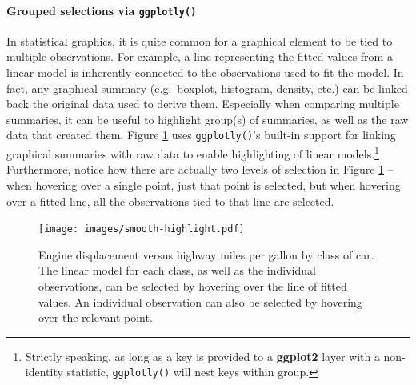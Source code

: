 \documentclass[12pt,]{isuthesis}
\newenvironment{Shaded}{\begin{snugshade}}{\end{snugshade}}
\newcommand{\KeywordTok}[1]{\textcolor[rgb]{0.13,0.29,0.53}{\textbf{{#1}}}}
\newcommand{\DataTypeTok}[1]{\textcolor[rgb]{0.13,0.29,0.53}{{#1}}}
\newcommand{\StringTok}[1]{\textcolor[rgb]{0.31,0.60,0.02}{{#1}}}
\newcommand{\CommentTok}[1]{\textcolor[rgb]{0.56,0.35,0.01}{\textit{{#1}}}}
\newcommand{\OtherTok}[1]{\textcolor[rgb]{0.56,0.35,0.01}{{#1}}}
\newcommand{\NormalTok}[1]{{#1}}
\let\oldparagraph\paragraph
\renewcommand{\paragraph}[1]{\oldparagraph{#1}\mbox{}}
\let\rmarkdownfootnote\footnote%
\def\footnote{\protect\rmarkdownfootnote}
\begin{document}
\paragraph{\texorpdfstring{Grouped selections via
\texttt{ggplotly()}}{Grouped selections via ggplotly()}}\label{grouped-selections-via-ggplotly}

In statistical graphics, it is quite common for a graphical element to
be tied to multiple observations. For example, a line representing the
fitted values from a linear model is inherently connected to the
observations used to fit the model. In fact, any graphical summary
(e.g.~boxplot, histogram, density, etc.) can be linked back the original
data used to derive them. Especially when comparing multiple summaries,
it can be useful to highlight group(s) of summaries, as well as the raw
data that created them. Figure \ref{fig:smooth-highlight} uses
\texttt{ggplotly()}'s built-in support for linking graphical summaries
with raw data to enable highlighting of linear models.\footnote{Strictly
  speaking, as long as a key is provided to a \textbf{ggplot2} layer
  with a non-identity statistic, \texttt{ggplotly()} will nest keys
  within group.} Furthermore, notice how there are actually two levels
of selection in Figure \ref{fig:smooth-highlight} -- when hovering over
a single point, just that point is selected, but when hovering over a
fitted line, all the observations tied to that line are selected.

\begin{Shaded}
\end{Shaded}

\begin{figure}
\centering
\texttt{[image: images/smooth-highlight.pdf]}
\caption{\label{fig:smooth-highlight}Engine displacement versus highway
miles per gallon by class of car. The linear model for each class, as
well as the individual observations, can be selected by hovering over
the line of fitted values. An individual observation can also be
selected by hovering over the relevant point.}
\end{figure}
\end{document}
